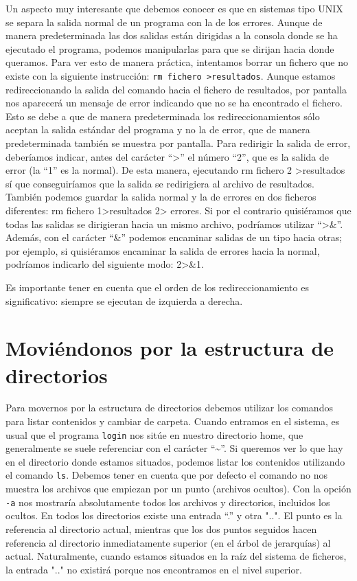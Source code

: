 \documentclass[12pt]{article}
\begin{document}
Un aspecto muy interesante que debemos conocer es que en sistemas tipo UNIX 
se separa la salida normal de un programa con la de los errores. Aunque de  
manera predeterminada las dos salidas están dirigidas a la consola donde 
se ha ejecutado el programa, podemos manipularlas para que se dirijan hacia 
donde queramos. Para ver esto de manera práctica, intentamos borrar un fichero 
que no existe con la siguiente instrucción: \texttt{rm fichero \textgreater resultados}. Aunque 
estamos redireccionando la salida del comando hacia el fichero de resultados, 
por pantalla nos aparecerá un mensaje de error indicando que no se ha encontrado 
el fichero. Esto se debe a que de manera predeterminada los redireccionamientos sólo aceptan 
la salida estándar del programa y no la de error, que de manera predeterminada también se 
muestra por pantalla. Para redirigir la salida de error, deberíamos indicar, 
antes del carácter ``\textgreater'' el número ``2'', que es la salida de error (la ``1'' es la 
normal). De esta manera, ejecutando rm fichero 2 \textgreater resultados sí que conseguiríamos
que la salida se redirigiera al archivo de resultados. También podemos guardar 
la salida normal y la de errores en dos ficheros diferentes: rm fichero 1\textgreater resultados 2\textgreater 
errores. Si por el contrario quisiéramos que todas las salidas se dirigieran
 hacia un mismo archivo, podríamos utilizar ``\textgreater\&''. Además, con el carácter ``\&'' 
podemos encaminar salidas de un tipo hacia otras; por ejemplo, si quisiéramos 
encaminar la salida de errores hacia la normal, podríamos indicarlo del 
siguiente modo: 2\textgreater\&1.

Es importante tener en cuenta que el orden de los redireccionamiento es 
significativo: siempre se ejecutan de izquierda a derecha.

\section{Moviéndonos por la estructura de directorios}

Para movernos por la estructura de directorios debemos utilizar los comandos para 
listar contenidos y cambiar de carpeta. Cuando entramos en el sistema, es usual 
que el programa \texttt{login} nos sitúe en nuestro directorio home, que generalmente se suele 
referenciar con el carácter ``\textasciitilde''. Si queremos ver lo que hay en el 
directorio donde estamos situados, podemos listar los contenidos utilizando el 
comando \texttt{ls}. Debemos tener en cuenta que por defecto el comando no nos muestra los 
archivos que empiezan por un punto (archivos ocultos). Con la opción \texttt{-a} nos mostraría 
absolutamente todos los archivos y directorios, incluidos los ocultos. En todos los directorios existe una entrada 
``.'' y otra "..". El punto es la referencia al directorio actual, mientras 
que los dos puntos seguidos hacen referencia al directorio inmediatamente superior 
(en el árbol de jerarquías) al actual. Naturalmente, cuando estamos situados en 
la raíz del sistema de ficheros, la entrada ".." no existirá porque nos encontramos 
en el nivel superior.
\end{document}
